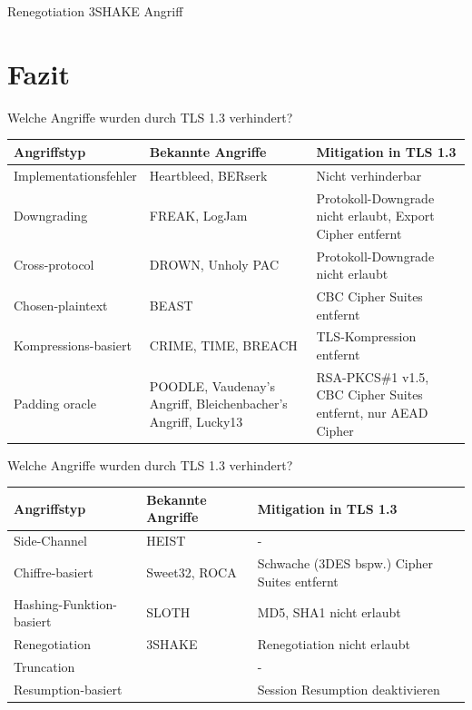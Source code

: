 \documentclass{f4_beamer_metropolis}
\begin{document}
\begin{frame}{Renegotiation}
3SHAKE Angriff
\end{frame}

\section{Fazit}

\begin{frame}{Welche Angriffe wurden durch TLS 1.3 verhindert?}

  \begin{tabularx}{\textwidth}{
    |>{\hsize} Y |
    >{\hsize} Y |
    >{\hsize} Y |
  }
  \hline
  \textbf{Angriffstyp} & \textbf{Bekannte Angriffe} & \textbf{Mitigation in TLS 1.3}\\ \hline
  Implementationsfehler & Heartbleed, BERserk & Nicht verhinderbar \\ \hline
  Downgrading & FREAK, LogJam & Protokoll-Downgrade nicht erlaubt, Export Cipher entfernt \\ \hline
  Cross-protocol & DROWN, Unholy PAC & Protokoll-Downgrade nicht erlaubt \\ \hline
  Chosen-plaintext & BEAST & CBC Cipher Suites entfernt \\ \hline
  Kompressions-basiert & CRIME, TIME, BREACH & TLS-Kompression entfernt \\ \hline
  Padding oracle & POODLE, Vaudenay's Angriff, Bleichenbacher's Angriff, Lucky13 & RSA-PKCS\#1 v1.5, CBC Cipher Suites entfernt, nur AEAD Cipher \\ \hline
  \end{tabularx}


  \note{
  }
\end{frame}

\begin{frame}{Welche Angriffe wurden durch TLS 1.3 verhindert?}
  \begin{tabularx}{\textwidth}{
    |>{\hsize} Y |
    >{\hsize} Y |
    >{\hsize} Y |
  }
  \hline
  \textbf{Angriffstyp} & \textbf{Bekannte Angriffe} & \textbf{Mitigation in TLS 1.3}\\ \hline
  Side-Channel & HEIST & - \\ \hline
  Chiffre-basiert & Sweet32, ROCA & Schwache (3DES bspw.) Cipher Suites entfernt \\ \hline
  Hashing-Funktion-basiert & SLOTH & MD5, SHA1 nicht erlaubt \\ \hline
  Renegotiation & 3SHAKE & Renegotiation nicht erlaubt \\ \hline
  Truncation & \autocite{TruncatingTLS} & - \\ \hline
  Resumption-basiert & \autocite{TrackingUsers} & Session Resumption deaktivieren \\ \hline
  \end{tabularx}

  \note{
  }
\end{frame}
\end{document}
